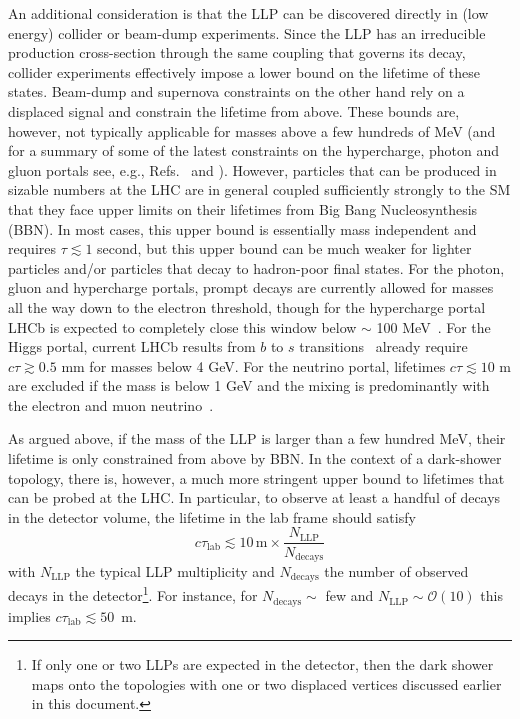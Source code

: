 An additional consideration is that the LLP can be discovered directly in (low energy) collider or beam-dump experiments. Since the LLP has an irreducible production cross-section through the same coupling that governs its decay, collider experiments effectively impose a lower bound on the lifetime of these states. Beam-dump and supernova constraints on the other hand rely on a displaced signal and constrain the lifetime from above. These bounds are, however, not typically applicable for masses above a few hundreds of MeV (and for a summary of some of the latest constraints on the hypercharge, photon and gluon portals see, e.g., Refs.~\cite{Ilten:2018crw} and \cite{Bauer:2017ris}). However, particles that can be produced in sizable numbers at the LHC are in general coupled sufficiently strongly to the SM that they face upper limits on their lifetimes from Big Bang Nucleosynthesis (BBN). In most cases, this upper bound is essentially mass independent and requires $\tau\lesssim 1$ second, but this upper bound can be much weaker for lighter particles and/or particles that decay to hadron-poor final states.  For the photon, gluon and hypercharge portals, prompt decays are currently allowed for masses all the way down to the electron threshold, though for the hypercharge portal LHCb is expected to completely close this window below $\sim$ 100 MeV~\cite{Ilten:2015hya,Ilten:2016tkc}. For the Higgs  portal, current LHCb results from $b$ to $s$ transitions~\cite{Aaij:2015tna,Aaij:2016qsm} already require $c\tau \gtrsim 0.5$ mm for masses below 4 GeV. For the neutrino portal, lifetimes $c\tau\lesssim 10$ m are excluded if the mass is below 1 GeV and the mixing is predominantly with the electron and muon neutrino~\cite{Deppisch:2015qwa}.

As argued above, if the mass of the LLP is larger than a few hundred MeV, their lifetime is only constrained from above by BBN. In the context of a dark-shower topology, there is, however, a much more stringent upper bound to lifetimes that can be probed at the LHC. In particular, to observe at least a handful of decays in the detector volume, the lifetime in the lab frame should satisfy
\begin{equation}
c\tau_{\text{lab}} \lesssim 10 \,\text{m}\times \frac{N_{\text{LLP}}}{N_{\text{decays}}}
\end{equation}
with $N_{\text{LLP}}$ the typical LLP multiplicity and $N_{\text{decays}}$ the number of observed decays in the detector\footnote{If only one or two LLPs are expected in the detector, then the dark shower maps onto the topologies with one or two displaced vertices discussed earlier in this document.}. For instance, for $N_{\text{decays}}\sim$ few and $N_{\text{LLP}}\sim \mathcal{O}(10)$ this implies $c\tau_{\text{lab}}\lesssim 50$~m.

